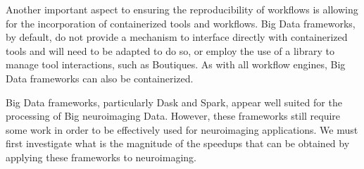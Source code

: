         Another important aspect to ensuring the reproducibility of workflows is
        allowing for the incorporation of containerized tools and workflows. Big
        Data frameworks, by default, do not provide a mechanism to interface
        directly with containerized tools and will need to be adapted to do so,
        or employ the use of a library to manage tool interactions, such as
        Boutiques. As with all workflow engines, Big Data frameworks can also be
        containerized.

        Big Data frameworks, particularly Dask and Spark, appear well suited for
        the processing of Big neuroimaging Data. However, these frameworks still
        require some work in order to be effectively used for neuroimaging applications.
        We must first investigate what is the magnitude of the speedups that can be
        obtained by applying these frameworks to neuroimaging.

